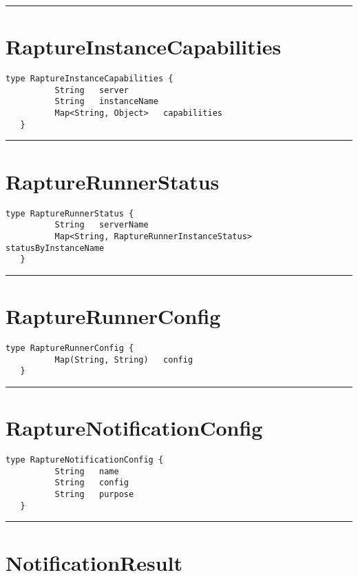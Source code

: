 \rule{12cm}{2pt}
\section{RaptureInstanceCapabilities}
\label{type:RaptureInstanceCapabilities}

\begin{lstlisting}[style=nonumbers]
   type RaptureInstanceCapabilities {
          String   server
          String   instanceName
          Map<String, Object>   capabilities
   }
\end{lstlisting}

\rule{12cm}{2pt}
\section{RaptureRunnerStatus}
\label{type:RaptureRunnerStatus}

\begin{lstlisting}[style=nonumbers]
   type RaptureRunnerStatus {
          String   serverName
          Map<String, RaptureRunnerInstanceStatus>   statusByInstanceName
   }
\end{lstlisting}

\rule{12cm}{2pt}
\section{RaptureRunnerConfig}
\label{type:RaptureRunnerConfig}

\begin{lstlisting}[style=nonumbers]
   type RaptureRunnerConfig {
          Map(String, String)   config
   }
\end{lstlisting}

\rule{12cm}{2pt}
\section{RaptureNotificationConfig}
\label{type:RaptureNotificationConfig}

\begin{lstlisting}[style=nonumbers]
   type RaptureNotificationConfig {
          String   name
          String   config
          String   purpose
   }
\end{lstlisting}

\rule{12cm}{2pt}
\section{NotificationResult}
\label{type:NotificationResult}

